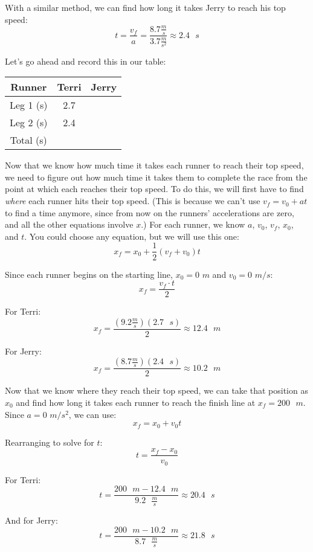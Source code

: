 With a similar method, we can find how long it takes Jerry to reach his top 
speed:
$$t = \frac{v_f}{a} = \frac{8.7 \frac{m}{s}}{3.7 \frac{m}{s^2}} \approx 2.4
\text{ }s$$

Let's go ahead and record this in our table:
\begin{center}
\begin{tabular}{|c|c|c|}
\hline
Runner & Terri & Jerry\\\hline
Leg 1 (s) & 2.7 & \\\hline
Leg 2 (s) & 2.4 & \\\hline
Total (s) & & \\\hline
\end{tabular}
\end{center}

Now that we know how much time it takes each runner to reach their top speed, we 
need to figure out how much time it takes them to complete the race from the 
point at which each reaches their top speed. To do this, we will first have to 
find \textit{where} each runner hits their top speed. (This is because we can't 
use $v_f = v_0 + at$ to find a time anymore, since from now on the runners' 
accelerations are zero, and all the other equations involve $x$.) For each 
runner, we know $a$, $v_0$, $v_f$, $x_0$, and $t$. You could choose any equation, 
but we will use this one:
$$x_f = x_0 + \frac{1}{2} \left( v_f + v_0 \right)t$$

Since each runner begins on the starting line, $x_0 = 0$ $m$ and $v_0 = 0$ $m/s$:
$$x_f = \frac{v_f \cdot t}{2}$$

For Terri:
$$x_f = \frac{\left(9.2 \frac{m}{s} \right) \left(2.7\text{ }s \right)}{2} 
\approx 12.4 \text{ }m$$

For Jerry:
$$x_f = \frac{\left( 8.7 \frac{m}{s} \right) \left( 2.4 \text{ }s \right)}{2} 
\approx 10.2 \text{ }m$$

Now that we know where they reach their top speed, we can take that position as 
$x_0$ and find how long it takes each runner to reach the finish line at $x_f = 
200\text{ }m$. Since $a = 0$ $m/s^2$, we can use:
$$x_f = x_0 + v_0 t$$

Rearranging to solve for $t$:
$$t = \frac{x_f - x_0}{v_0}$$

For Terri:
$$t = \frac{200 \text{ } m - 12.4 \text{ } m}{9.2 \text{ } \frac{m}{s}} \approx 
20.4\text{ }s$$

And for Jerry:
$$t = \frac{200 \text{ } m - 10.2 \text{ } m}{8.7 \text{ } \frac{m}{s}} \approx 
21.8 \text{ } s$$

